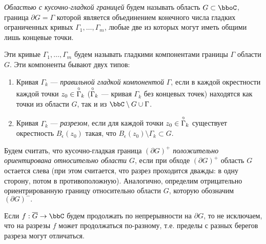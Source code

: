 \begin{leftbar}
\begin{defn} \label{ch33defn1}
\textit{Областью с кусочно-гладкой границей} будем называть область $G \subset \bboC$, граница $\partial G=\Gamma$ которой является объединением конечного числа гладких ограниченных кривых $\Gamma_1 , \dots , \Gamma_m$, любые две из которых могут иметь общими лишь концевые точки. 

Эти кривые $\Gamma_1 , \dots , \Gamma_m$ будем называть гладкими компонентами границы $\Gamma$ области $G$. Эти компоненты бывают двух типов:
\end{defn}

\begin{enumerate}
\item
Кривая $\Gamma_k$ --- \textit{правильной гладкой компонентой} $\Gamma$, если в каждой окрестности каждой точки $z_0 \in \;\buildrel\circ\over\Gamma_k$ ($\buildrel\circ\over\Gamma_k$ --- кривая $\Gamma_k$ без концевых точек) находятся как точки из области $G$, так и из $\bbC \setminus G\cup\Gamma$. 

\item
Кривая $\Gamma_k$ --- \textit{разрезом}, если для каждой точки $z_0 \in\; \buildrel\circ\over\Gamma_k$ существует окрестность $B_\epsilon(z_0)$ такая, что $B_\epsilon(z_0)\setminus\Gamma_k \subset G$.
\end{enumerate}
\begin{defn} \label{ch33defn2} 
Будем считать, что кусочно-гладкая граница $(\partial G)^{+}$ \textit{положительно ориентирована относительно области $G$}, если при обходе $(\partial G)^{+}$ область $G$ остается слева (при этом считается, что разрез проходится дважды: в одну сторону, потом в противоположную). Аналогично, определим отрицательно ориентрированную границу относительно области $G$, которую обозначим $(\partial G)^{-}.$
\end{defn}
\end{leftbar}

Если $f:\overline{G}\to\bbC$ будем продолжать по непрерывности на $\partial G$, то не исключаем, что на разрезы $f$ может продолжаться по-разному, т.е. пределы с разных берегов разреза могут отличаться. 

